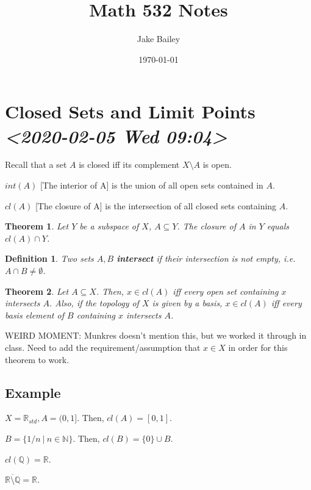 \documentclass[11pt]{article}
\author{Jake Bailey}
\date{\today}
\title{Math 532 Notes}
\newtheorem{theorem}{Theorem}[section]
\newtheorem{definition}{Definition}[section]
\begin{document}
\maketitle
\tableofcontents


\section{Closed Sets and Limit Points \textit{<2020-02-05 Wed 09:04>}}
\label{sec:org9e64f2d}

Recall that a set \(A\) is closed iff its complement \(X\setminus A\) is
open.

\(int(A)\) [The interior of A] is the union of all open sets contained in \(A\). 

\(cl(A)\) [The closure of A] is the intersection of all closed sets
containing \(A\).

\begin{theorem}
Let \(Y\) be a subspace of \(X\), \(A \subseteq Y\). The closure of \(A\) in
\(Y\) equals \(cl(A) \cap Y\).
\end{theorem}

\begin{definition}
Two sets \(A,B\) \textbf{intersect} if their intersection is not empty,
i.e. \(A \cap B \not= \emptyset\).
\end{definition}

\begin{theorem}
Let \(A \subseteq X\). Then, \(x \in cl(A)\) iff every open set containing
\(x\) intersects \(A\). Also, if the topology of \(X\) is given by a basis,
\(x \in cl(A)\) iff every basis element of \(B\) containing \(x\) intersects \(A\).
\end{theorem}

WEIRD MOMENT: Munkres doesn't mention this, but we worked it through
in class. Need to add the requirement/assumption that \(x\in X\) in
order for this theorem to work.

\subsection{Example}
\label{sec:org169ef1e}

\(X = \mathbb{R}_{std}, A = (0,1]\). Then, \(cl(A) = [0,1]\).

\(B = \{ 1/n\ |\ n \in \mathbb{N}\}\). Then, \(cl(B) = \{0\}\cup B\).

\(cl(\mathbb{Q}) = \mathbb{R}\).

\(\overline{\mathbb{R}\setminus\mathbb{Q}} = \mathbb{R}\).
\end{document}
